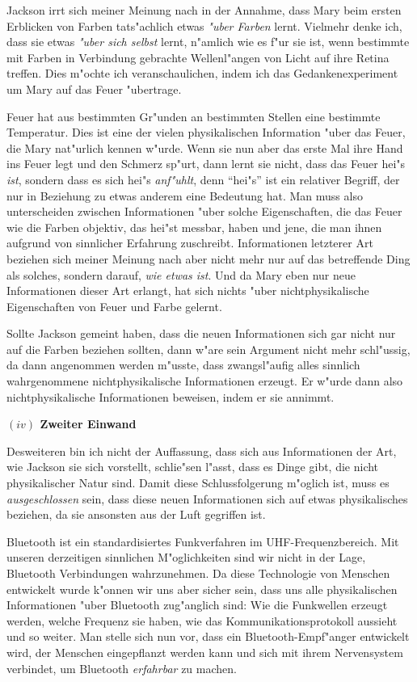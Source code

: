 \documentclass[a4paper, emulatestandardclasses, 12pt]{scrartcl}
\begin{document}
\begin{onehalfspace}
\noindent Jackson irrt sich meiner Meinung nach in der Annahme, dass Mary beim ersten Erblicken von Farben tats"achlich etwas \emph{"uber Farben} lernt. Vielmehr denke ich, dass sie etwas \emph{"uber sich selbst} lernt, n"amlich wie es f"ur sie ist, wenn bestimmte mit Farben in Verbindung gebrachte Wellenl"angen von Licht auf ihre Retina treffen. Dies m"ochte ich veranschaulichen, indem ich das Gedankenexperiment um Mary auf das Feuer "ubertrage. 

Feuer hat aus bestimmten Gr"unden an bestimmten Stellen eine bestimmte Temperatur. Dies ist eine der vielen physikalischen Information "uber das Feuer, die Mary nat"urlich kennen w"urde. Wenn sie nun aber das erste Mal ihre Hand ins Feuer legt und den Schmerz sp"urt, dann lernt sie nicht, dass das Feuer hei"s \emph{ist}, sondern dass es sich hei"s \emph{anf"uhlt}, denn "`hei"s"' ist ein relativer Begriff, der nur in Beziehung zu etwas anderem eine Bedeutung hat. Man muss also unterscheiden zwischen Informationen "uber solche Eigenschaften, die das Feuer wie die Farben objektiv, das hei"st messbar, haben und jene, die man ihnen aufgrund von sinnlicher Erfahrung zuschreibt. Informationen letzterer Art beziehen sich meiner Meinung nach aber nicht mehr nur auf das betreffende Ding als solches, sondern darauf, \emph{wie etwas ist}. Und da Mary eben nur neue Informationen dieser Art erlangt, hat sich nichts "uber nichtphysikalische Eigenschaften von Feuer und Farbe gelernt. 

Sollte Jackson gemeint haben, dass die neuen Informationen sich gar nicht nur auf die Farben beziehen sollten, dann w"are sein Argument nicht mehr schl"ussig, da dann angenommen werden m"usste, dass zwangsl"aufig alles sinnlich wahrgenommene nichtphysikalische Informationen erzeugt. Er w"urde dann also nichtphysikalische Informationen beweisen, indem er sie annimmt.

\vspace{5mm}
\noindent\textbf{$(iv)$ Zweiter Einwand}

\noindent Desweiteren bin ich nicht der Auffassung, dass sich aus Informationen der Art, wie Jackson sie sich vorstellt, schlie"sen l"asst, dass es Dinge gibt, die nicht physikalischer Natur sind. %
Damit diese Schlussfolgerung m"oglich ist, muss es \emph{ausgeschlossen} sein, dass diese neuen Informationen sich auf etwas physikalisches beziehen, da sie ansonsten aus der Luft gegriffen ist. 	

Bluetooth ist ein standardisiertes Funkverfahren im UHF-Frequenzbereich. Mit unseren derzeitigen sinnlichen M"oglichkeiten sind wir nicht in der Lage, Bluetooth Verbindungen wahrzunehmen. Da diese Technologie von Menschen entwickelt wurde k"onnen wir uns aber sicher sein, dass uns alle physikalischen Informationen "uber Bluetooth zug"anglich sind: Wie die Funkwellen erzeugt werden, welche Frequenz sie haben, wie das Kommunikationsprotokoll aussieht und so weiter. Man stelle sich nun vor, dass ein Bluetooth-Empf"anger entwickelt wird, der Menschen eingepflanzt werden kann und sich mit ihrem Nervensystem verbindet, um Bluetooth \emph{erfahrbar} zu machen. 


\end{onehalfspace}
\end{document}
